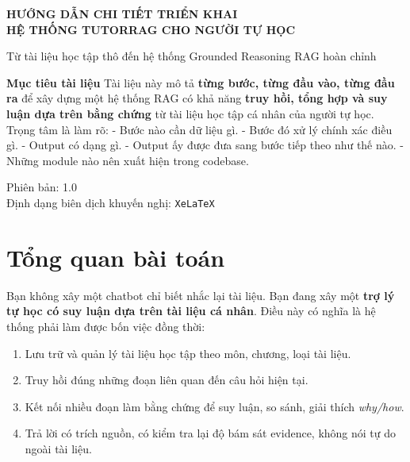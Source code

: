 \documentclass[12pt,a4paper]{article}
\begin{document}
\begin{titlepage}
    \centering
    \vspace*{1.5cm}
    {\Huge\bfseries\color{Primary} HƯỚNG DẪN CHI TIẾT TRIỂN KHAI\\[0.3em]
    HỆ THỐNG TUTORRAG CHO NGƯỜI TỰ HỌC\par}
    \vspace{1cm}
    {\Large Từ tài liệu học tập thô đến hệ thống Grounded Reasoning RAG hoàn chỉnh\par}
    \vspace{1.2cm}
    \begin{overviewbox}
    \textbf{Mục tiêu tài liệu}\newline
    Tài liệu này mô tả \textbf{từng bước, từng đầu vào, từng đầu ra} để xây dựng một hệ thống RAG có khả năng \textbf{truy hồi, tổng hợp và suy luận dựa trên bằng chứng} từ tài liệu học tập cá nhân của người tự học. Trọng tâm là làm rõ:\newline
    - Bước nào cần dữ liệu gì.\newline
    - Bước đó xử lý chính xác điều gì.\newline
    - Output có dạng gì.\newline
    - Output ấy được đưa sang bước tiếp theo như thế nào.\newline
    - Những module nào nên xuất hiện trong codebase.
    \end{overviewbox}
    \vfill
    {\large Phiên bản: 1.0\\[0.25em]
    Định dạng biên dịch khuyến nghị: \texttt{XeLaTeX}}
    \vspace{1cm}
\end{titlepage}

\tableofcontents
\newpage

\section{Tổng quan bài toán}

Bạn không xây một chatbot chỉ biết nhắc lại tài liệu. Bạn đang xây một \textbf{trợ lý tự học có suy luận dựa trên tài liệu cá nhân}. Điều này có nghĩa là hệ thống phải làm được bốn việc đồng thời:
\begin{enumerate}[label=\arabic*.]
    \item Lưu trữ và quản lý tài liệu học tập theo môn, chương, loại tài liệu.
    \item Truy hồi đúng những đoạn liên quan đến câu hỏi hiện tại.
    \item Kết nối nhiều đoạn làm bằng chứng để suy luận, so sánh, giải thích \textit{why/how}.
    \item Trả lời có trích nguồn, có kiểm tra lại độ bám sát evidence, không nói tự do ngoài tài liệu.
\end{enumerate}
\end{document}
